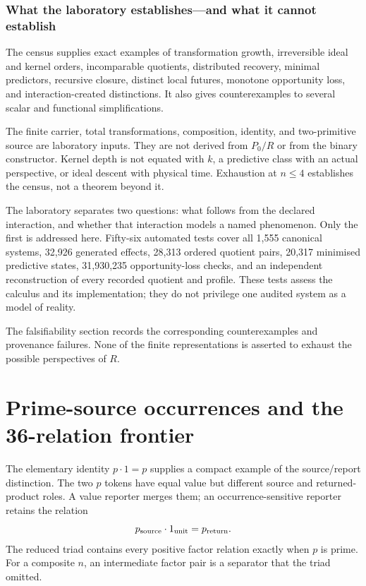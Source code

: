 \documentclass[11pt,a4paper]{article}
\begin{document}
\subsubsection{What the laboratory establishes---and what it
cannot
establish}

The census supplies exact examples of transformation growth,
irreversible ideal and kernel orders, incomparable quotients,
distributed recovery, minimal predictors, recursive closure, distinct
local futures, monotone opportunity loss, and interaction-created
distinctions. It also gives counterexamples to several scalar and
functional simplifications.

The finite carrier, total transformations, composition, identity, and
two-primitive source are laboratory inputs. They are not derived from
\(P_{0}/R\) or from the binary constructor. Kernel depth is not equated
with \(k\), a predictive class with an actual perspective, or ideal
descent with physical time. Exhaustion at \(n \leq 4\) establishes the
census, not a theorem beyond it.

The laboratory separates two questions: what follows from the declared
interaction, and whether that interaction models a named phenomenon.
Only the first is addressed here. Fifty-six automated tests cover all
1,555 canonical systems, 32,926 generated effects, 28,313 ordered
quotient pairs, 20,317 minimised predictive states, 31,930,235
opportunity-loss checks, and an independent reconstruction of every
recorded quotient and profile. These tests assess the calculus and its
implementation; they do not privilege one audited system as a model of
reality.

The falsifiability section records the corresponding counterexamples and
provenance failures. None of the finite representations is asserted to
exhaust the possible perspectives of \(R\).

\section{Prime-source occurrences and the 36-relation frontier}
The elementary identity $p\cdot1=p$ supplies a compact example of the source/report distinction. The two $p$ tokens have equal value but different source and returned-product roles. A value reporter merges them; an occurrence-sensitive reporter retains the relation
\begin{equation}
p_{\rm source}\cdot1_{\rm unit}=p_{\rm return}.
\end{equation}
The reduced triad contains every positive factor relation exactly when $p$ is prime. For a composite $n$, an intermediate factor pair is a separator that the triad omitted.
\end{document}
